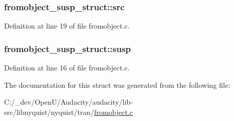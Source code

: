 \subsubsection[{\texorpdfstring{src}{src}}]{ fromobject\+\_\+susp\+\_\+struct\+::src}\hypertarget{structfromobject__susp__struct_a53e21196401f6758aef9adccdc7eb9f0}{}\label{structfromobject__susp__struct_a53e21196401f6758aef9adccdc7eb9f0}


Definition at line 19 of file fromobject.\+c.

\subsubsection[{\texorpdfstring{susp}{susp}}]{ fromobject\+\_\+susp\+\_\+struct\+::susp}\hypertarget{structfromobject__susp__struct_a1227c317cad4a4c492c5c8abd7b47a92}{}\label{structfromobject__susp__struct_a1227c317cad4a4c492c5c8abd7b47a92}


Definition at line 16 of file fromobject.\+c.



The documentation for this struct was generated from the following file\+:\begin{DoxyCompactItemize}
\item 
C\+:/\+\_\+dev/\+Open\+U/\+Audacity/audacity/lib-\/src/libnyquist/nyquist/tran/\hyperlink{fromobject_8c}{fromobject.\+c}\end{DoxyCompactItemize}
